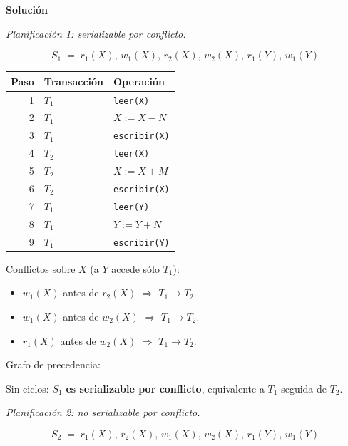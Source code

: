 \documentclass[11pt,a4paper]{article}
\newcommand{\itemcabecera}[1]{\noindent\textbf{#1}\par\medskip}
\newcommand{\bloqueSolucion}{\itemcabecera{Soluci\'on}}
\begin{document}
\bloqueSolucion

\textit{Planificación 1: serializable por conflicto.}

\[
S_1 \;=\; r_1(X),\, w_1(X),\, r_2(X),\, w_2(X),\, r_1(Y),\, w_1(Y)
\]

\begin{center}
\begin{tabular}{rll}
\toprule
Paso & Transacción & Operación \\
\midrule
1 & $T_1$ & \texttt{leer(X)} \\
2 & $T_1$ & $X := X - N$ \\
3 & $T_1$ & \texttt{escribir(X)} \\
4 & $T_2$ & \texttt{leer(X)} \\
5 & $T_2$ & $X := X + M$ \\
6 & $T_2$ & \texttt{escribir(X)} \\
7 & $T_1$ & \texttt{leer(Y)} \\
8 & $T_1$ & $Y := Y + N$ \\
9 & $T_1$ & \texttt{escribir(Y)} \\
\bottomrule
\end{tabular}
\end{center}

Conflictos sobre $X$ (a $Y$ accede sólo $T_1$):

\begin{itemize}
    \item $w_1(X)$ antes de $r_2(X)$ $\Rightarrow$ $T_1 \rightarrow T_2$.
    \item $w_1(X)$ antes de $w_2(X)$ $\Rightarrow$ $T_1 \rightarrow T_2$.
    \item $r_1(X)$ antes de $w_2(X)$ $\Rightarrow$ $T_1 \rightarrow T_2$.
\end{itemize}

Grafo de precedencia:
\begin{center}
\end{center}

Sin ciclos: $S_1$ \textbf{es serializable por conflicto}, equivalente a $T_1$ seguida de $T_2$.

\textit{Planificación 2: no serializable por conflicto.}

\[
S_2 \;=\; r_1(X),\, r_2(X),\, w_1(X),\, w_2(X),\, r_1(Y),\, w_1(Y)
\]
\end{document}
